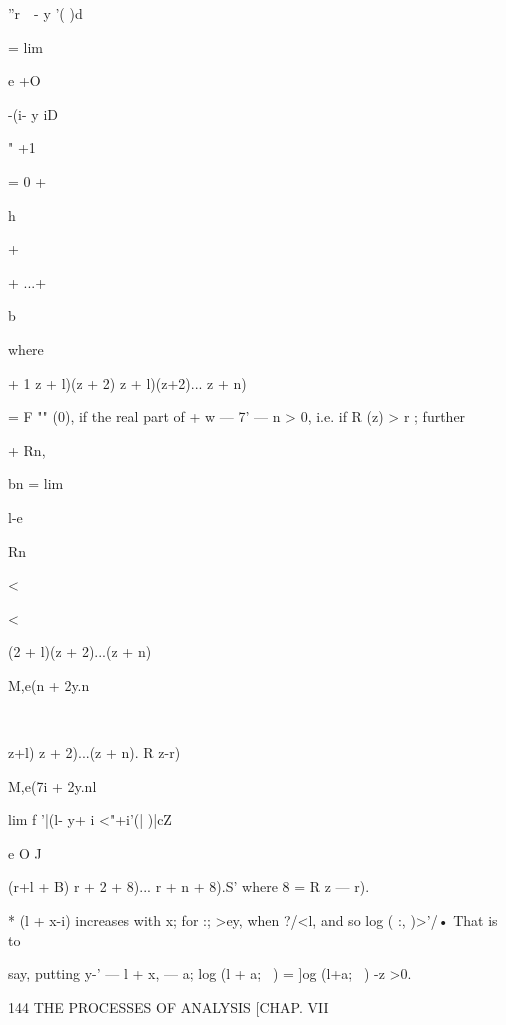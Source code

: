 {''r\ \ - y '( )d



= lim

e +O



-(i- y iD



" +1



= 0 +



h



+



+ ...+



b



where



+ 1 z + l)(z + 2) z + l)(z+2)... z + n)

= F "" (0), if the real part of + w — 7' — n > 0, i.e. if R (z) > r ;
further



+ Rn,



bn = lim



l-e




Rn\ \



<



<



(2 + l)(z + 2)...(z + n)

M,e(n + 2y.n\

\ \ {z+l) z + 2)...(z + n). R z-r)

M,e(7i + 2y.nl



lim f '|(l- y+ i <"+i'(| )|cZ

e O J



(r+l + B) r + 2 + 8)... r + n + 8).S' where 8 = R z — r).

* (l + x-i) increases with x; for :; >ey, when ?/<l, and so log ( :,
)>'/• That is to

say, putting y-' — l + x, — a; log (l + a;~ ) = ]og (l+a;~ ) -z >0.



144 THE PROCESSES OF ANALYSIS [CHAP. VII



}}

